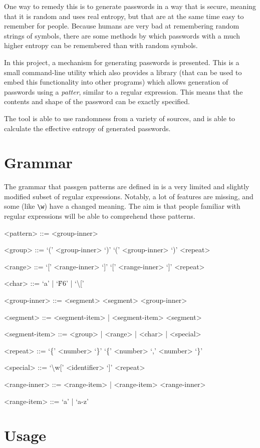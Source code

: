 \documentclass[a4paper]{article}
\begin{document}
One way to remedy this is to generate passwords in a way that is secure, meaning that it is random and uses real entropy, but that are at the same time easy to remember for people. Because humans are very bad at remembering random strings of symbols, there are some methods by which passwords with a much higher entropy can be remembered than with random symbols.

In this project, a mechanism for generating passwords is presented. This is a small command-line utility which also provides a library (that can be used to embed this functionality into other programs) which allows generation of passwords using a \emph{patter}, similar to a regular expression. This means that the contents and shape of the password can be exactly specified.

The tool is able to use randomness from a variety of sources, and is able to calculate the effective entropy of generated passwords.

\section{Grammar}

The grammar that passgen patterns are defined in is a very limited and slightly modified subset of regular expressions. Notably, a lot of features are missing, and some (like \verb|\w|) have a changed meaning. The aim is that people familiar with regular expressions will be able to comprehend these patterns.

\setlength{\grammarindent}{4em}
\begin{grammar}

<pattern> ::= <group-inner>

<group> ::= ‘(’ <group-inner> ‘)’ \alt ‘(’ <group-inner> ‘)’ <repeat>

<range> ::= ‘[’ <range-inner> ‘]’ \alt ‘[’ <range-inner> ‘]’ <repeat>

<char> ::= ‘a’ | ‘\u{F6}’ | ‘\textbackslash [’

<group-inner> ::= <segment> \alt <segment> <group-inner>

<segment> ::= <segment-item> | <segment-item> <segment>

<segment-item> ::= <group> | <range> | <char> | <special>

<repeat> ::= ‘\{’ <number> ‘\}’ \alt ‘\{’ <number> ‘,’ <number> ‘\}’

<special> ::= ‘\textbackslash w[’ <identifier> ‘]’ <repeat>

<range-inner> ::= <range-item> | <range-item> <range-inner>

<range-item> ::= ‘a’ | ‘a-z’

\end{grammar}

\section{Usage}
\end{document}
